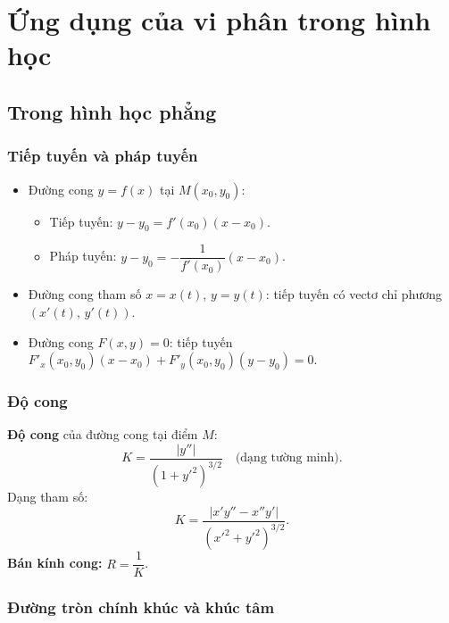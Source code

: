 \documentclass[12pt,a4paper]{article}
\begin{document}
\section{Ứng dụng của vi phân trong hình học}

\subsection{Trong hình học phẳng}

\subsubsection{Tiếp tuyến và pháp tuyến}

\begin{congthuc}
  \begin{itemize}
    \item Đường cong $y = f(x)$ tại $M(x_0, y_0)$:
      \begin{itemize}
        \item Tiếp tuyến: $y - y_0 = f'(x_0)(x - x_0)$.
        \item Pháp tuyến: $y - y_0 = -\dfrac{1}{f'(x_0)}(x - x_0)$.
      \end{itemize}
    \item Đường cong tham số $x = x(t)$, $y = y(t)$: tiếp tuyến có vectơ chỉ phương $(x'(t),\, y'(t))$.
    \item Đường cong $F(x,y) = 0$: tiếp tuyến $F'_x(x_0,y_0)(x-x_0) + F'_y(x_0,y_0)(y-y_0) = 0$.
  \end{itemize}
\end{congthuc}

\subsubsection{Độ cong}

\begin{dinhnghia}
  \textbf{Độ cong} của đường cong tại điểm $M$:
  \[
    K = \dfrac{|y''|}{(1 + y'^2)^{3/2}} \quad\text{(dạng tường minh)}.
  \]
  Dạng tham số:
  \[
    K = \dfrac{|x'y'' - x''y'|}{(x'^2 + y'^2)^{3/2}}.
  \]
  \textbf{Bán kính cong:} $R = \dfrac{1}{K}$.
\end{dinhnghia}

\subsubsection{Đường tròn chính khúc và khúc tâm}
\end{document}
